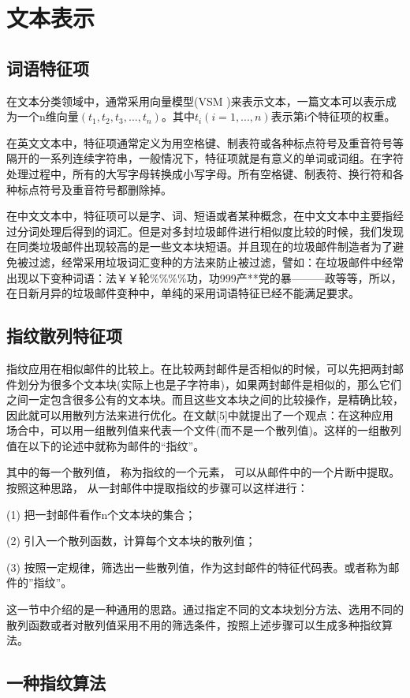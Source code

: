 \section{文本表示}
\subsection{词语特征项}
在文本分类领域中，通常采用向量模型(VSM )来表示文本，一篇文本可以表示成为一个n维向量$(t_1,t_2,t_3,...,t_n)$。其中$t_i(i=1,...,n)$表示第i个特征项的权重。

在英文文本中，特征项通常定义为用空格键、制表符或各种标点符号及重音符号等隔开的一系列连续字符串，一般情况下，特征项就是有意义的单词或词组。在字符处理过程中，所有的大写字母转换成小写字母。所有空格键、制表符、换行符和各种标点符号及重音符号都删除掉。

在中文文本中，特征项可以是字、词、短语或者某种概念，在中文文本中主要指经过分词处理后得到的词汇。但是对多封垃圾邮件进行相似度比较的时候，我们发现在同类垃圾邮件出现较高的是一些文本块短语。并且现在的垃圾邮件制造者为了避免被过滤，经常采用垃圾词汇变种的方法来防止被过滤，譬如：在垃圾邮件中经常出现以下变种词语：法￥￥轮\%\%\%\%功，功999产**党的暴———政等等，所以，在日新月异的垃圾邮件变种中，单纯的采用词语特征已经不能满足要求。

\subsection{指纹散列特征项}
指纹应用在相似邮件的比较上。在比较两封邮件是否相似的时候，可以先把两封邮件划分为很多个文本块(实际上也是子字符串)，如果两封邮件是相似的，那么它们之间一定包含很多公有的文本块。而且这些文本块之间的比较操作，是精确比较，因此就可以用散列方法来进行优化。在文献[5]中就提出了一个观点：在这种应用场合中，可以用一组散列值来代表一个文件(而不是一个散列值)。这样的一组散列值在以下的论述中就称为邮件的“指纹”。

其中的每一个散列值， 称为指纹的一个元素， 可以从邮件中的一个片断中提取。按照这种思路， 从一封邮件中提取指纹的步骤可以这样进行：

(1) 把一封邮件看作n个文本块的集合；

(2) 引入一个散列函数，计算每个文本块的散列值；

(3) 按照一定规律，筛选出一些散列值，作为这封邮件的特征代码表。或者称为邮件的”指纹”。

这一节中介绍的是一种通用的思路。通过指定不同的文本块划分方法、选用不同的散列函数或者对散列值采用不用的筛选条件，按照上述步骤可以生成多种指纹算法。

\subsection{一种指纹算法}

